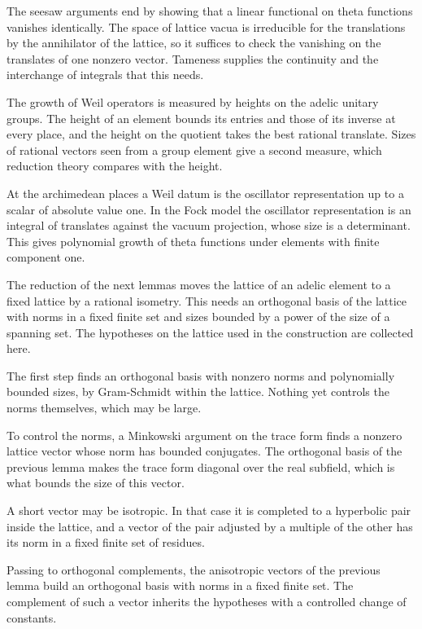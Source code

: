 The seesaw arguments end by showing that a linear functional on theta
functions vanishes identically. The space of lattice vacua is irreducible for
the translations by the annihilator of the lattice, so it suffices to check the
vanishing on the translates of one nonzero vector. Tameness supplies the
continuity and the interchange of integrals that this needs.

The growth of Weil operators is measured by heights on the adelic unitary
groups. The height of an element bounds its entries and those of its inverse at
every place, and the height on the quotient takes the best rational translate.
Sizes of rational vectors seen from a group element give a second measure,
which reduction theory compares with the height.

At the archimedean places a Weil datum is the oscillator representation up to a
scalar of absolute value one. In the Fock model the oscillator representation
is an integral of translates against the vacuum projection, whose size is a
determinant. This gives polynomial growth of theta functions under elements
with finite component one.

The reduction of the next lemmas moves the lattice of an adelic element to a
fixed lattice by a rational isometry. This needs an orthogonal basis of the
lattice with norms in a fixed finite set and sizes bounded by a power of the
size of a spanning set. The hypotheses on the lattice used in the construction
are collected here.

The first step finds an orthogonal basis with nonzero norms and polynomially
bounded sizes, by Gram-Schmidt within the lattice. Nothing yet controls the
norms themselves, which may be large.

To control the norms, a Minkowski argument on the trace form finds a nonzero
lattice vector whose norm has bounded conjugates. The orthogonal basis of the
previous lemma makes the trace form diagonal over the real subfield, which is
what bounds the size of this vector.

A short vector may be isotropic. In that case it is completed to a hyperbolic
pair inside the lattice, and a vector of the pair adjusted by a multiple of the
other has its norm in a fixed finite set of residues.

Passing to orthogonal complements, the anisotropic vectors of the previous
lemma build an orthogonal basis with norms in a fixed finite set. The
complement of such a vector inherits the hypotheses with a controlled change of
constants.

